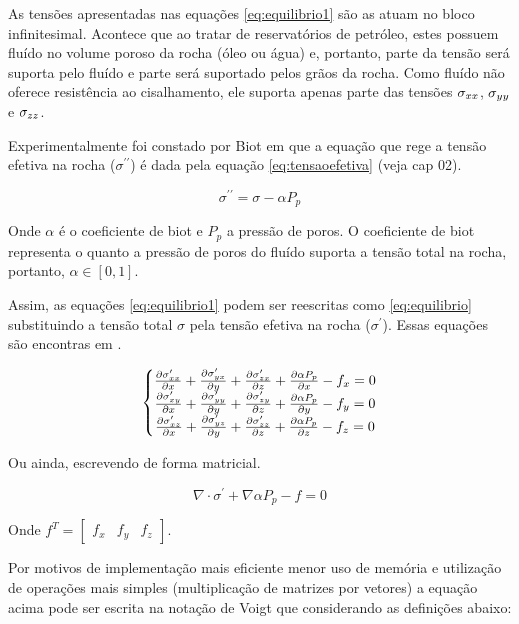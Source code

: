 As tensões apresentadas nas equações \ref{eq:equilibrio1} são as atuam no bloco infinitesimal. Acontece que ao tratar de reservatórios de petróleo, estes possuem fluído no volume poroso da rocha (óleo ou água) e, portanto, parte da tensão será suporta pelo fluído e parte será suportado pelos grãos da rocha. Como fluído não oferece resistência ao cisalhamento, ele suporta apenas parte das tensões $\sigma_{xx}$, $\sigma_{yy}$ e $\sigma_{zz}$.

Experimentalmente foi constado por Biot em que a equação que rege a tensão efetiva na rocha ($\sigma^{\prime\prime}$) é dada pela equação \ref{eq:tensaoefetiva} (veja \cite{ResGeomec} cap 02).

\begin{equation}
\label{eq:tensaoefetiva}
    \sigma^{\prime\prime} = \sigma - \alpha P_p
\end{equation}

Onde $\alpha$ é o coeficiente de biot e $P_p$ a pressão de poros. O coeficiente de biot representa o quanto a pressão de poros do fluído suporta a tensão total na rocha, portanto, $\alpha \in [0,1]$.

Assim, as equações \ref{eq:equilibrio1} podem ser reescritas como \ref{eq:equilibrio} substituindo a tensão total $\sigma$ pela tensão efetiva na rocha ($\sigma^\prime$). Essas equações são encontras em \cite{CompGeomec}.



\begin{equation}
\label{eq:equilibrio}
\left\{\begin{matrix}
\dx[\sxx]  + \dy[\syx] + \dz[\szx] + \dx[\alpha P_p] - f_x   = 0
\\
\dx[\sxy]  + \dy[\syy] + \dz[\szy] + \dy[\alpha P_p]  - f_y   = 0
\\
\dx[\sxz]  + \dy[\syz] + \dz[\szz] + \dz[\alpha P_p] - f_z   = 0
\end{matrix}\right.
\end{equation}

Ou ainda, escrevendo de forma matricial.

\begin{equation}
\label{eq:equilibrio_matriz}
\nabla \cdot \sigma^\prime + \nabla \alpha P_p - f = 0
\end{equation}

Onde $f^T=\begin{bmatrix}f_x & f_y & f_z\end{bmatrix}$.


Por motivos de implementação mais eficiente menor uso de memória e utilização de operações mais simples (multiplicação de matrizes por vetores) a equação acima pode ser escrita na notação de Voigt que considerando as definições abaixo:

